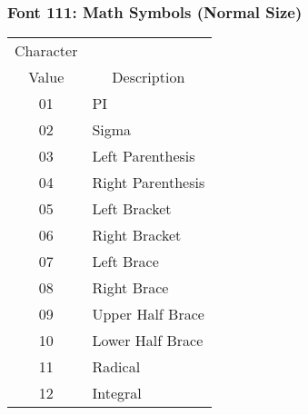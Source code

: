 \subsubsection{Font 111: Math Symbols (Normal Size)}
\begin{tabular}{|c|l|}
\hline
\multicolumn{1}{|c|}{Character}&\\
\multicolumn{1}{|c|}{Value}
&\multicolumn{1}{|c|}{Description}\\
\hline
01 & PI\\
02 & Sigma\\
03 & Left Parenthesis\\
04 & Right Parenthesis\\
05 & Left Bracket\\
06 & Right Bracket\\
07 & Left Brace\\
08 & Right Brace\\
09 & Upper Half Brace\\
10 & Lower Half Brace\\
11 & Radical\\
12 & Integral\\ \hline
\end{tabular}
\newpage
